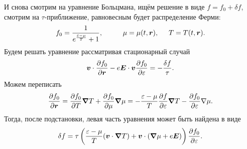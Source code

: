 И снова смотрим на уравнение Больцмана, ищём решение в виде $f = f_0 + \delta f$, смотрим на $\tau$-приближение, равновесным будет распределение Ферми:
\begin{equation*}
	f_0 = \frac{1}{e^{\frac{\varepsilon-\mu}{T}} + 1},
	\hspace{10 mm} 
	\mu = \mu (t, \vc{r}),
	\hspace{5 mm} 
	T = T(t, \vc{r}).
\end{equation*}
Будем решать уравнение рассматривая стационарный случай
\begin{equation*}
	\boldsymbol{v} \cdot \frac{\partial f_0}{\partial \boldsymbol{r}} - e \boldsymbol{E} \cdot \boldsymbol{v} \frac{\partial f_0}{\partial \varepsilon}  = - \frac{\delta f}{\tau}.
\end{equation*}
Можем переписать 
\begin{equation*}
	\frac{\partial f_0}{\partial \boldsymbol{r}} = \frac{\partial f_0}{\partial T}  \boldsymbol{\nabla} T + \frac{\partial f_0}{\partial \mu} \boldsymbol{\nabla} \mu = - \frac{\varepsilon-\mu}{T} \frac{\partial f}{\partial \varepsilon} \boldsymbol{\nabla} T - \frac{\partial f_0}{\partial \varepsilon} \nabla \mu.
\end{equation*}
Тогда, после подстановки, левая часть уравнения может быть найдена в виде
\begin{equation*}
	\delta f = \tau \left(
		\frac{\varepsilon-\mu}{T} (\boldsymbol{v} \cdot \boldsymbol{\nabla} T) + \boldsymbol{v} \cdot (\boldsymbol{\nabla} \mu + e \boldsymbol{E})
	\right) \frac{\partial f_0}{\partial \varepsilon} .
\end{equation*}


